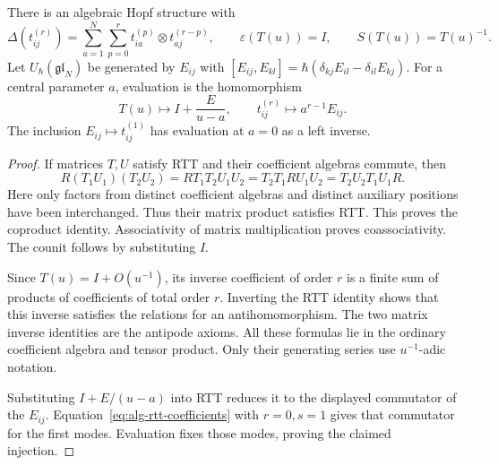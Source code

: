 \begin{proposition}
\label{prop:alg-rtt-hopf}
There is an algebraic Hopf structure with
\[
 \Delta(t_{ij}^{(r)})=
 \sum_{a=1}^N\sum_{p=0}^r t_{ia}^{(p)}\otimes t_{aj}^{(r-p)},
 \qquad \varepsilon(T(u))=I,\qquad S(T(u))=T(u)^{-1}.
\]
Let $U_\hbar(\mathfrak{gl}_N)$ be generated by $E_{ij}$ with
$[E_{ij},E_{kl}]=\hbar(\delta_{kj}E_{il}-\delta_{il}E_{kj})$.
For a central parameter $a$, evaluation is the homomorphism
\[
 T(u)\longmapsto I+\frac{E}{u-a},
 \qquad t_{ij}^{(r)}\longmapsto a^{r-1}E_{ij}.
\]
The inclusion $E_{ij}\mapsto t_{ij}^{(1)}$ has evaluation at $a=0$ as a left inverse.
\end{proposition}
\begin{proof}
If matrices $T,U$ satisfy RTT and their coefficient algebras commute, then
\[
 R(T_1U_1)(T_2U_2)
 =RT_1T_2U_1U_2
 =T_2T_1RU_1U_2
 =T_2U_2T_1U_1R.
\]
Here only factors from distinct coefficient algebras and distinct auxiliary positions have been interchanged.
Thus their matrix product satisfies RTT.
This proves the coproduct identity. Associativity of matrix multiplication proves coassociativity.
The counit follows by substituting $I$.

Since $T(u)=I+O(u^{-1})$, its inverse coefficient of order $r$ is a finite sum of products of coefficients of total order $r$.
Inverting the RTT identity shows that this inverse satisfies the relations for an antihomomorphism.
The two matrix inverse identities are the antipode axioms.
All these formulas lie in the ordinary coefficient algebra and tensor product. Only their generating series use $u^{-1}$-adic notation.

Substituting $I+E/(u-a)$ into RTT reduces it to the displayed commutator of the $E_{ij}$.
Equation~\eqref{eq:alg-rtt-coefficients} with $r=0,s=1$ gives that commutator for the first modes.
Evaluation fixes those modes, proving the claimed injection.
\end{proof}

